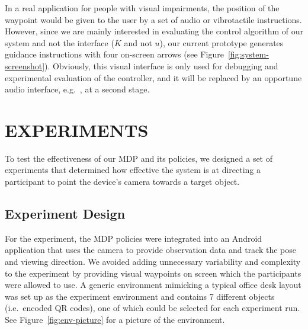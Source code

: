 \documentclass[a4paper, twoside]{article}
\begin{document}
In a real application for people with visual impairments, the position of the waypoint would be given to the user by a set of audio or vibrotactile instructions. However, since we are mainly interested in evaluating the control algorithm of our system and not the interface ($K$ and not $u$), our current prototype generates guidance instructions with four on-screen arrows (see Figure~\ref{fig:system-screenshot}).
Obviously, this visual interface is only used for debugging and experimental evaluation of the controller, and it will be replaced by an opportune audio interface, e.g.~\cite{bellotto2013}, at a second stage.


\section{\uppercase{Experiments}}\label{sec:experiments}

\noindent To test the effectiveness of our MDP and its policies, we designed a set of experiments that determined how effective the system is at directing a participant to point the device's camera towards a target object.

\subsection{Experiment Design}

\noindent For the experiment, the MDP policies were integrated into an Android application that uses the camera to provide observation data and track the pose and viewing direction. We avoided adding unnecessary variability and complexity to the experiment by providing visual waypoints on screen which the participants were allowed to use. A generic environment mimicking a typical office desk layout was set up as the experiment environment and contains 7 different objects (i.e.\ encoded QR codes), one of which could be selected for each experiment run. See Figure~\ref{fig:env-picture} for a picture of the environment. 
\end{document}
